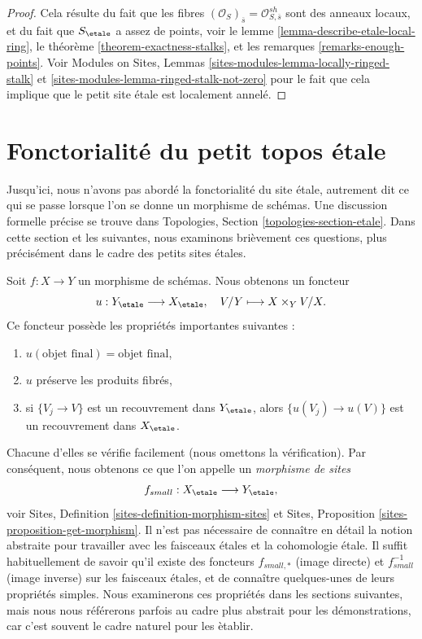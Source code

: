 \begin{proof}
Cela r\'esulte du fait que les fibres
$(\mathcal{O}_S)_{\overline{s}} = \mathcal{O}^{sh}_{S, \overline{s}}$ sont
des anneaux locaux, et du fait que $S_\etale$ a assez de points, voir
le lemme \ref{lemma-describe-etale-local-ring},
le th\'eor\`eme \ref{theorem-exactness-stalks},
et les
remarques \ref{remarks-enough-points}.
Voir
Modules on Sites, Lemmas \ref{sites-modules-lemma-locally-ringed-stalk} et
\ref{sites-modules-lemma-ringed-stalk-not-zero}
pour le fait que cela implique que le petit site \'etale est localement annel\'e.
\end{proof}






\section{Fonctorialit\'e du petit topos \'etale}
\label{section-functoriality}

\noindent
Jusqu'ici, nous n'avons pas abord\'e la fonctorialit\'e du site \'etale,
autrement dit ce qui se passe lorsque l'on se donne un morphisme de sch\'emas. Une
discussion formelle pr\'ecise se trouve dans
Topologies, Section \ref{topologies-section-etale}.
Dans cette section et les suivantes, nous examinons bri\`evement ces questions,
plus pr\'ecis\'ement dans le cadre des petits sites \'etales.

\medskip\noindent
Soit $f : X \to Y$ un morphisme de sch\'emas. Nous obtenons un foncteur
\begin{equation}
\label{equation-functorial}
u : Y_\etale \longrightarrow X_\etale, \quad
V/Y \longmapsto X \times_Y V/X.
\end{equation}
Ce foncteur poss\`ede les propri\'et\'es importantes suivantes :
\begin{enumerate}
\item $u(\text{objet final}) = \text{objet final}$,
\item $u$ pr\'eserve les produits fibr\'es,
\item si $\{V_j \to V\}$ est un recouvrement dans $Y_\etale$, alors
$\{u(V_j) \to u(V)\}$ est un recouvrement dans $X_\etale$.
\end{enumerate}
Chacune d'elles se v\'erifie facilement (nous omettons la v\'erification). Par cons\'equent, nous obtenons ce
que l'on appelle un {\it morphisme de sites}
$$
f_{small} : X_\etale \longrightarrow Y_\etale,
$$
voir
Sites, Definition \ref{sites-definition-morphism-sites}
et
Sites, Proposition \ref{sites-proposition-get-morphism}.
Il n'est pas n\'ecessaire de conna\^itre en d\'etail la notion abstraite
pour travailler avec les faisceaux \'etales et la cohomologie \'etale.
Il suffit habituellement de savoir qu'il existe des foncteurs
$f_{small, *}$ (image directe) et $f_{small}^{-1}$ (image inverse)
sur les faisceaux \'etales, et de conna\^itre quelques-unes de leurs propri\'et\'es simples.
Nous examinerons ces propri\'et\'es dans les sections suivantes, mais nous nous
r\'ef\'ererons parfois au cadre plus abstrait pour les d\'emonstrations, car
c'est souvent le cadre naturel pour les \`etablir.


